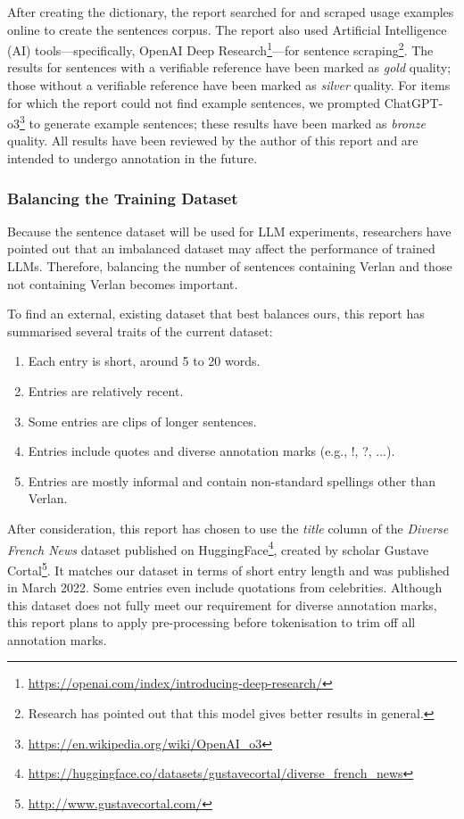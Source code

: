 \documentclass[12pt]{article}
\begin{document}
After creating the dictionary, the report searched for and scraped usage examples online to create the sentences corpus. The report also used Artificial Intelligence (AI) tools\;---\;specifically, OpenAI Deep Research\footnote{\url{https://openai.com/index/introducing-deep-research/}}\;---\;for sentence scraping\footnote{Research has pointed out that this model gives better results in general\cite{du2025deepresearch}.}. The results for sentences with a verifiable reference have been marked as \textit{gold} quality; those without a verifiable reference have been marked as \textit{silver} quality. For items for which the report could not find example sentences, we prompted ChatGPT-o3\footnote{\url{https://en.wikipedia.org/wiki/OpenAI_o3}} to generate example sentences; these results have been marked as \textit{bronze} quality. All results have been reviewed by the author of this report and are intended to undergo annotation in the future.

\subsubsection{Balancing the Training Dataset}

Because the sentence dataset will be used for LLM experiments, researchers have pointed out that an imbalanced dataset may affect the performance of trained LLMs. Therefore, balancing the number of sentences containing Verlan and those not containing Verlan becomes important\cite{dong2024imbalance}.

To find an external, existing dataset that best balances ours, this report has summarised several traits of the current dataset:

\begin{enumerate}
  \item Each entry is short, around 5 to 20 words.
  \item Entries are relatively recent.
  \item Some entries are clips of longer sentences.
  \item Entries include quotes and diverse annotation marks (e.g., !, ?, ...).
  \item Entries are mostly informal and contain non-standard spellings other than Verlan.
\end{enumerate}

After consideration, this report has chosen to use the \textit{title} column of the \textit{Diverse French News} dataset published on HuggingFace\footnote{\url{https://huggingface.co/datasets/gustavecortal/diverse_french_news}}, created by scholar Gustave Cortal\footnote{\url{http://www.gustavecortal.com/}}. It matches our dataset in terms of short entry length and was published in March 2022. Some entries even include quotations from celebrities. Although this dataset does not fully meet our requirement for diverse annotation marks, this report plans to apply pre-processing before tokenisation to trim off all annotation marks. 
\end{document}
